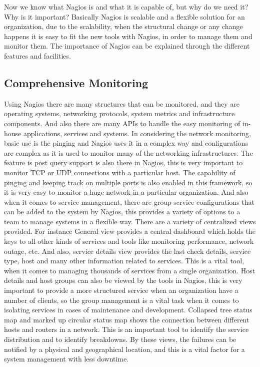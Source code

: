 \documentclass[9pt,twocolumn,twoside]{styles/osajnl}
\begin{document}
Now we know what Nagios is and what it is capable of, but why do we need it? Why is it important? Basically Nagios is scalable and a flexible solution for an organization, due to the scalability, when the structural change or any change happens it is easy to fit the new tools with Nagios, in order to manage them and monitor them. The importance of Nagios can be explained through the different features and facilities.

\subsection{Comprehensive Monitoring}

Using Nagios there are many structures that can be monitored, and they are operating systems, networking protocols, system metrics and infrastructure components. And also there are many APIs to handle the easy monitoring of in-house applications, services and systems. In considering the network monitoring, basic use is the pinging and Nagios uses it in a complex way and configurations are complex as it is used to monitor many of the networking infrastructures. The feature is post query support is also there in Nagios, this is very important to monitor TCP or UDP connections with a particular host. The capability of pinging and keeping track on multiple ports is also enabled in this framework, so it is very easy to monitor a huge network in a particular organization.  And also when it comes to service management, there are group service configurations that can be added to the system by Nagios, this provides a variety of options to a team to manage systems in a flexible way. There are a variety of centralized views provided. For instance General view provides a central dashboard which holds the keys to all other kinds of services and tools like monitoring performance, network outage, etc. And also, service details view provides the last check details, service type, host and many other information related to services. This is a vital tool, when it comes to managing thousands of services from a single organization. Host details and host groups can also be viewed by the tools in Nagios, this is very important to provide a more structured service when an organization have a number of clients, so the group management is a vital task when it comes to isolating services in cases of maintenance and development. Collapsed tree status map and marked up circular status map shows the connection between different hosts and routers in a network. This is an important tool to identify the service distribution and to identify breakdowns. By these views, the failures can be notified by a physical and geographical location, and this is a vital factor for a system management with less downtime.  
\end{document}
